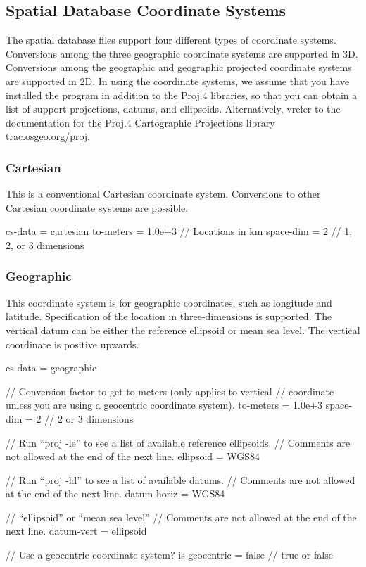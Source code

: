 \subsection{Spatial Database Coordinate Systems}

The spatial database files support four different types of coordinate
systems. Conversions among the three geographic coordinate systems
are supported in 3D. Conversions among the geographic and geographic
projected coordinate systems are supported in 2D. In using the coordinate
systems, we assume that you have installed the  program
in addition to the Proj.4 libraries, so that you can obtain a list
of support projections, datums, and ellipsoids. Alternatively, vrefer
to the documentation for the Proj.4 Cartographic Projections library
\url{trac.osgeo.org/proj}.

\subsubsection{Cartesian}

This is a conventional Cartesian coordinate system. Conversions to
other Cartesian coordinate systems are possible.
\begin{SimpleIOAscii}
cs-data = cartesian {
  to-meters = 1.0e+3 // Locations in km
  space-dim = 2 // 1, 2, or 3 dimensions
}
\end{SimpleIOAscii}

\subsubsection{Geographic}

This coordinate system is for geographic coordinates, such as longitude
and latitude. Specification of the location in three-dimensions is
supported. The vertical datum can be either the reference ellipsoid
or mean sea level. The vertical coordinate is positive upwards.
\begin{SimpleIOAscii}
cs-data = geographic {
  // Conversion factor to get to meters (only applies to vertical 
  // coordinate unless you are using a geocentric coordinate system).
  to-meters = 1.0e+3
  space-dim = 2 // 2 or 3 dimensions

  // Run ``proj -le'' to see a list of available reference ellipsoids.
  // Comments are not allowed at the end of the next line.
  ellipsoid = WGS84

  // Run ``proj -ld'' to see a list of available datums.
  // Comments are not allowed at the end of the next line.
  datum-horiz = WGS84

  // ``ellipsoid'' or ``mean sea level''
  // Comments are not allowed at the end of the next line.
  datum-vert = ellipsoid

  // Use a geocentric coordinate system?
  is-geocentric = false // true or false
}
\end{SimpleIOAscii}

